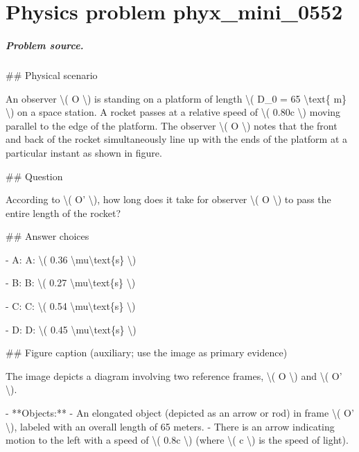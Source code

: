 
\chapter{Physics problem phyx\_mini\_0552}
\label{ch:PhyXMiniProblems_problem_phyx_mini_0552}

\paragraph{Problem source.}
\#\# Physical scenario

An observer \textbackslash{}( O \textbackslash{}) is standing on a platform of length \textbackslash{}( D\_0 = 65 \textbackslash{}text\{ m\} \textbackslash{}) on a space station. A rocket passes at a relative speed of \textbackslash{}( 0.80c \textbackslash{}) moving parallel to the edge of the platform. The observer \textbackslash{}( O \textbackslash{}) notes that the front and back of the rocket simultaneously line up with the ends of the platform at a particular instant as shown in figure.

\#\# Question

According to \textbackslash{}( O' \textbackslash{}), how long does it take for observer \textbackslash{}( O \textbackslash{}) to pass the entire length of the rocket?

\#\# Answer choices

- A: A: \textbackslash{}( 0.36 \textbackslash{}mu\textbackslash{}text\{s\} \textbackslash{})

- B: B: \textbackslash{}( 0.27 \textbackslash{}mu\textbackslash{}text\{s\} \textbackslash{})

- C: C: \textbackslash{}( 0.54 \textbackslash{}mu\textbackslash{}text\{s\} \textbackslash{})

- D: D: \textbackslash{}( 0.45 \textbackslash{}mu\textbackslash{}text\{s\} \textbackslash{})

\#\# Figure caption (auxiliary; use the image as primary evidence)

The image depicts a diagram involving two reference frames, \textbackslash{}( O \textbackslash{}) and \textbackslash{}( O' \textbackslash{}).

- **Objects:**
  - An elongated object (depicted as an arrow or rod) in frame \textbackslash{}( O' \textbackslash{}), labeled with an overall length of 65 meters.
  - There is an arrow indicating motion to the left with a speed of \textbackslash{}( 0.8c \textbackslash{}) (where \textbackslash{}( c \textbackslash{}) is the speed of light).
  
